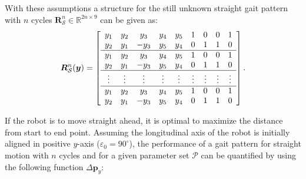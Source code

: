 \documentclass[letterpaper,10pt,conference]{ieeeconf}  %
\begin{document}

With these assumptions a structure for the still unknown straight gait pattern with $n$ cycles $\bm{R}_\mathcal{S}^n \in \mathbb{R}^{2n \times 9} $ can be given as:
\begin{equation}
\bm{R}_\mathcal{S}^n(\bm{y})
=
\left[
\begin{array}{ccccc cccc}
y_1&y_2& y_3&y_4&y_5&1&0&0&1 \\
y_2&y_1&-y_3&y_5&y_4&0&1&1&0 \\ 
\hline
y_1&y_2& y_3&y_4&y_5&1&0&0&1 \\
y_2&y_1&-y_3&y_5&y_4&0&1&1&0 \\
\hline
\vdots&\vdots&\vdots&\vdots&\vdots&\vdots&\vdots&\vdots&\vdots \\
\hline
y_1&y_2& y_3&y_4&y_5&1&0&0&1 \\
y_2&y_1&-y_3&y_5&y_4&0&1&1&0 \\
\end{array}
\right] .
\label{eq:gait_ptrn}
\end{equation}




If the robot is to move straight ahead, it is optimal to maximize the distance from start to end point.
Assuming the longitudinal axis of the robot is initially aligned in positive $y$-axis ($\varepsilon_0 = 90^\circ$), the performance of a gait pattern for straight motion with $n$ cycles and for a given parameter set $\mathcal{P}$ can be quantified by using the following function $\Delta \bm{p}_y$:
\end{document}
